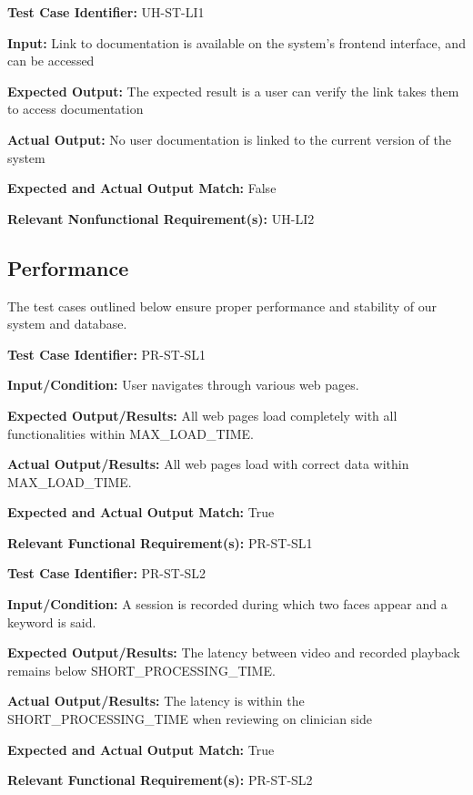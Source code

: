 \documentclass[12pt, titlepage]{article}
\begin{document}
\begin{mdframed}[linewidth=0.5mm] \par
  \textbf{Test Case Identifier:} UH-ST-LI1 \par
  \textbf{Input:} Link to documentation is available on the system's frontend interface, and can be accessed \par
  \textbf{Expected Output:} The expected result is a user can verify the link takes them to access documentation  \par
  \textbf{Actual Output:} No user documentation is linked to the current version of the system\par
  \textbf{Expected and Actual Output Match:} False \par
  \textbf{Relevant Nonfunctional Requirement(s):} UH-LI2
\end{mdframed}

\newpage{}

\subsection{Performance}
\hspace{2em}The test cases outlined below ensure proper performance and stability of our system and database.
\begin{mdframed}[linewidth=0.5mm]
  \textbf{Test Case Identifier:} PR-ST-SL1 \par
  \textbf{Input/Condition:} User navigates through various web pages. \par
  \textbf{Expected Output/Results:} All web pages load completely with all functionalities within MAX\_LOAD\_TIME. \par
  \textbf{Actual Output/Results:} All web pages load with correct data within\\ MAX\_LOAD\_TIME. \par
  \textbf{Expected and Actual Output Match:} True \par
  \textbf{Relevant Functional Requirement(s):} PR-ST-SL1
\end{mdframed}

\begin{mdframed}[linewidth=0.5mm]
  \textbf{Test Case Identifier:} PR-ST-SL2 \par
  \textbf{Input/Condition:} A session is recorded during which two faces appear and a keyword is said. \par
  \textbf{Expected Output/Results:} The latency between video and recorded playback remains below SHORT\_PROCESSING\_TIME. \par
  \textbf{Actual Output/Results:} The latency is within the \\SHORT\_PROCESSING\_TIME when reviewing on clinician side \par
  \textbf{Expected and Actual Output Match:} True \par
  \textbf{Relevant Functional Requirement(s):} PR-ST-SL2
\end{mdframed}
\end{document}
